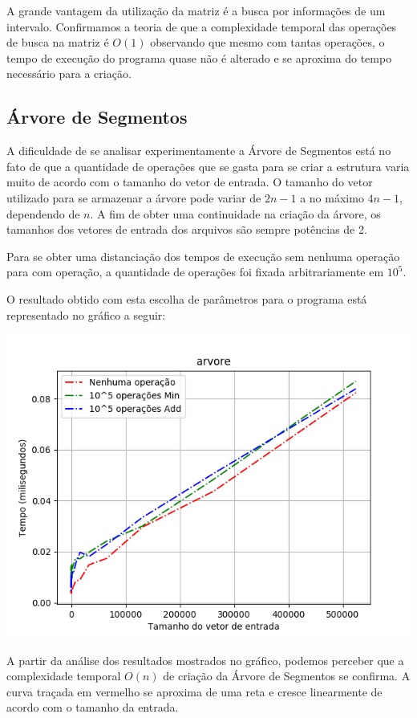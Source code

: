 \documentclass{article}
\begin{document}
A grande vantagem da utilização da matriz é a busca por informações de um intervalo. Confirmamos a teoria de que a complexidade temporal das operações de busca na matriz é $O(1)$ observando que mesmo com tantas operações, o tempo de execução do programa quase não é alterado e se aproxima do tempo necessário para a criação.

\subsection{Árvore de Segmentos}

A dificuldade de se analisar experimentamente a Árvore de Segmentos está no fato de que a quantidade de operações que se gasta para se criar a estrutura varia muito de acordo com o tamanho do vetor de entrada. O tamanho do vetor utilizado para se armazenar a árvore pode variar de $2n - 1$ a no máximo $4n - 1$, dependendo de $n$. A fim de obter uma continuidade na criação da árvore, os tamanhos dos vetores de entrada dos arquivos são sempre potências de 2.

Para se obter uma distanciação dos tempos de execução sem nenhuma operação para com operação, a quantidade de operações foi fixada arbitrariamente em $10^5$.

O resultado obtido com esta escolha de parâmetros para o programa está representado no gráfico a seguir:

\includegraphics[scale=0.70]{arvore}

A partir da análise dos resultados mostrados no gráfico, podemos perceber que a complexidade temporal $O(n)$ de criação da Árvore de Segmentos se confirma. A curva traçada em vermelho se aproxima de uma reta e cresce linearmente de acordo com o tamanho da entrada.
\end{document}
